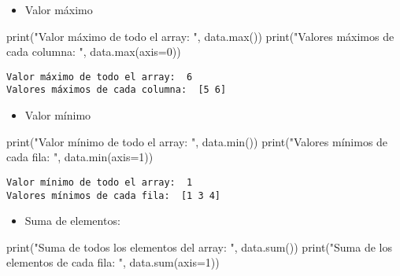 \documentclass[
  letterpaper,
  DIV=11,
  numbers=noendperiod]{scrreprt}
\newenvironment{Shaded}{\begin{snugshade}}{\end{snugshade}}
\newcommand{\BuiltInTok}[1]{\textcolor[rgb]{0.00,0.23,0.31}{#1}}
\newcommand{\DecValTok}[1]{\textcolor[rgb]{0.68,0.00,0.00}{#1}}
\newcommand{\NormalTok}[1]{\textcolor[rgb]{0.00,0.23,0.31}{#1}}
\newcommand{\OperatorTok}[1]{\textcolor[rgb]{0.37,0.37,0.37}{#1}}
\newcommand{\StringTok}[1]{\textcolor[rgb]{0.13,0.47,0.30}{#1}}
\providecommand{\tightlist}{%
  \setlength{\itemsep}{0pt}\setlength{\parskip}{0pt}}\usepackage{longtable,booktabs,array}
\begin{document}
\begin{itemize}
\tightlist
\item
  Valor máximo
\end{itemize}

\begin{Shaded}
\begin{Highlighting}[]
\BuiltInTok{print}\NormalTok{(}\StringTok{"Valor máximo de todo el array: "}\NormalTok{, data.}\BuiltInTok{max}\NormalTok{())}
\BuiltInTok{print}\NormalTok{(}\StringTok{"Valores máximos de cada columna: "}\NormalTok{, data.}\BuiltInTok{max}\NormalTok{(axis}\OperatorTok{=}\DecValTok{0}\NormalTok{))}
\end{Highlighting}
\end{Shaded}

\begin{verbatim}
Valor máximo de todo el array:  6
Valores máximos de cada columna:  [5 6]
\end{verbatim}

\begin{itemize}
\tightlist
\item
  Valor mínimo
\end{itemize}

\begin{Shaded}
\begin{Highlighting}[]
\BuiltInTok{print}\NormalTok{(}\StringTok{"Valor mínimo de todo el array: "}\NormalTok{, data.}\BuiltInTok{min}\NormalTok{())}
\BuiltInTok{print}\NormalTok{(}\StringTok{"Valores mínimos de cada fila: "}\NormalTok{, data.}\BuiltInTok{min}\NormalTok{(axis}\OperatorTok{=}\DecValTok{1}\NormalTok{))}
\end{Highlighting}
\end{Shaded}

\begin{verbatim}
Valor mínimo de todo el array:  1
Valores mínimos de cada fila:  [1 3 4]
\end{verbatim}

\begin{itemize}
\tightlist
\item
  Suma de elementos:
\end{itemize}

\begin{Shaded}
\begin{Highlighting}[]
\BuiltInTok{print}\NormalTok{(}\StringTok{"Suma de todos los elementos del array: "}\NormalTok{, data.}\BuiltInTok{sum}\NormalTok{())}
\BuiltInTok{print}\NormalTok{(}\StringTok{"Suma de los elementos de cada fila: "}\NormalTok{, data.}\BuiltInTok{sum}\NormalTok{(axis}\OperatorTok{=}\DecValTok{1}\NormalTok{))}
\end{Highlighting}
\end{Shaded}
\end{document}

